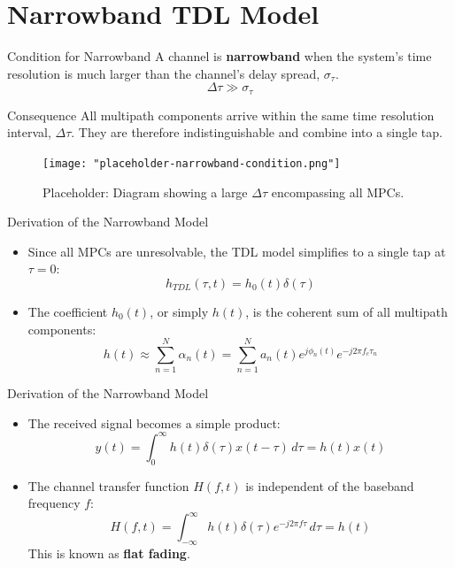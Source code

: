 \documentclass{beamer}
\begin{document}
	\section{Narrowband TDL Model}
	
	\begin{frame}{Condition for Narrowband}
		A channel is \textbf{narrowband} when the system's time resolution is much larger than the channel's delay spread, $\sigma_\tau$.
		\[ \Delta\tau \gg \sigma_\tau \]
		
		\begin{block}{Consequence}
			All multipath components arrive within the same time resolution interval, $\Delta\tau$. They are therefore indistinguishable and combine into a single tap.
		\end{block}
		\begin{figure}
			\centering
			\texttt{[image: "placeholder-narrowband-condition.png"]}
			\caption{Placeholder: Diagram showing a large $\Delta\tau$ encompassing all MPCs.}
		\end{figure}
	\end{frame}
	
	\begin{frame}{Derivation of the Narrowband Model}
		\begin{itemize}
			\item Since all MPCs are unresolvable, the TDL model simplifies to a single tap at $\tau=0$:
			\[ h_{TDL}(\tau, t) = h_0(t) \delta(\tau) \]
			
			\item The coefficient $h_0(t)$, or simply $h(t)$, is the coherent sum of all multipath components:
			\[ h(t) \approx \sum_{n=1}^{N} \alpha_n(t) = \sum_{n=1}^{N} a_n(t) e^{j\phi_n(t)} e^{-j2\pi f_c \tau_n} \]
		\end{itemize}
	\end{frame}
	
	\begin{frame}{Derivation of the Narrowband Model}
		\begin{itemize}
			\item The received signal becomes a simple product:
			\[ y(t) = \int_0^{\infty} h(t)\delta(\tau) x(t - \tau) \, d\tau = h(t)x(t) \]
			
			\item The channel transfer function $H(f,t)$ is independent of the baseband frequency $f$:
			\[ H(f,t) = \int_{-\infty}^{\infty} h(t)\delta(\tau) e^{-j2\pi f \tau} \, d\tau = h(t) \]
			This is known as \textbf{flat fading}.
		\end{itemize}
	\end{frame}
	
\end{document}
